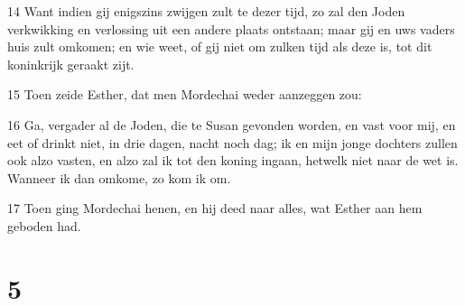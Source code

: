 \par 14 Want indien gij enigszins zwijgen zult te dezer tijd, zo zal den Joden verkwikking en verlossing uit een andere plaats ontstaan; maar gij en uws vaders huis zult omkomen; en wie weet, of gij niet om zulken tijd als deze is, tot dit koninkrijk geraakt zijt.
\par 15 Toen zeide Esther, dat men Mordechai weder aanzeggen zou:
\par 16 Ga, vergader al de Joden, die te Susan gevonden worden, en vast voor mij, en eet of drinkt niet, in drie dagen, nacht noch dag; ik en mijn jonge dochters zullen ook alzo vasten, en alzo zal ik tot den koning ingaan, hetwelk niet naar de wet is. Wanneer ik dan omkome, zo kom ik om.
\par 17 Toen ging Mordechai henen, en hij deed naar alles, wat Esther aan hem geboden had.

\chapter{5}

